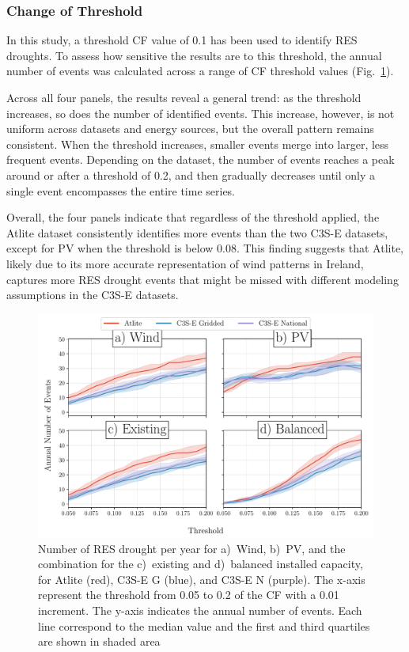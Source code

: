 \documentclass[a4paper, 11pt]{article}
\begin{document}
\newpage
\subsubsection{Change of Threshold}

In this study, a threshold CF value of 0.1 has been used to identify RES droughts. To assess how sensitive the results are to this threshold, the annual number of events was calculated across a range of CF threshold values (Fig.~\ref{fig:number_days_threshold}).

Across all four panels, the results reveal a general trend: as the threshold increases, so does the number of identified events. This increase, however, is not uniform across datasets and energy sources, but the overall pattern remains consistent. When the threshold increases, smaller events merge into larger, less frequent events. Depending on the dataset, the number of events reaches a peak around or after a threshold of 0.2, and then gradually decreases until only a single event encompasses the entire time series.

Overall, the four panels indicate that regardless of the threshold applied, the Atlite dataset consistently identifies more events than the two C3S-E datasets, except for PV when the threshold is below 0.08. This finding suggests that Atlite, likely due to its more accurate representation of wind patterns in Ireland, captures more RES drought events that might be missed with different modeling assumptions in the C3S-E datasets.

\begin{figure}[!ht]
	\centering
	\includegraphics[width=\textwidth]{droughts_varying_threshold}
	\caption{Number of RES drought per year for a)~Wind, b)~PV, and the combination for the c)~existing and d)~balanced installed capacity, for Atlite (red), C3S-E G (blue), and C3S-E N (purple). The x-axis represent the threshold from 0.05 to 0.2 of the CF with a 0.01 increment. The y-axis indicates the annual number of events. Each line correspond to the median value and the first and third quartiles are shown in shaded area}
	\label{fig:number_days_threshold}
\end{figure}
\end{document}
